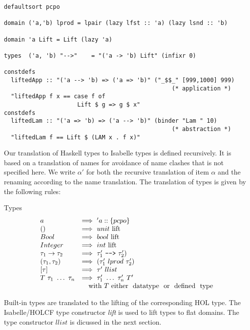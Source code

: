 \documentclass{llncs}
\begin{document}
\begin{verbatim} 
defaultsort pcpo

domain ('a,'b) lprod = lpair (lazy lfst :: 'a) (lazy lsnd :: 'b)

domain 'a Lift = Lift (lazy 'a)

types  ('a, 'b) "-->"    = "('a -> 'b) Lift" (infixr 0)

constdefs
  liftedApp :: "('a --> 'b) => ('a => 'b)" ("_$$_" [999,1000] 999)
                                                (* application *)
  "liftedApp f x == case f of
                     Lift $ g => g $ x"
constdefs
  liftedLam :: "('a => 'b) => ('a --> 'b)" (binder "Lam " 10)
                                                (* abstraction *)
  "liftedLam f == Lift $ (LAM x . f x)"
\end{verbatim}

Our translation of Haskell types to Isabelle types is defined
recursively.  It is based on a translation of names for avoidance of
name clashes that is not specified here. We write $\alpha'$ for both
the recursive translation of item $\alpha$ and the renaming according
to the name translation.  The translation of types is given by the
following rules:


\noindent Types
$$\begin{array}{ll}
  a & \Longrightarrow \ 'a::\{pcpo\} \\
  () & \Longrightarrow \ unit \ \mbox{lift} \\
  Bool & \Longrightarrow \ bool \ \mbox{lift} \\
  Integer & \Longrightarrow \ int \ \mbox{lift} \\
  \tau_{1} \to \tau_{2} & \Longrightarrow
  \ \tau'_{1} \ \verb@-->@ \ \tau'_{2})  \\
  (\tau_{1},\tau_{2}) & \Longrightarrow
  \ (\tau'_{1} ~lprod~ \tau'_{2}) \\
  {[\tau]} \ & \Longrightarrow \ \tau' \ llist \\
  T \ \tau_1 \ \ldots \ \tau_n & \Longrightarrow
  \ \tau'_1 \ \ldots \ \tau'_n \ T' \\
  & \quad \mbox{with} \ T \ \mbox{either \ datatype \ or \ defined \ type} \\
\end{array}$$

Built-in types are translated to the lifting of the corresponding HOL
type.  The Isabelle/HOLCF type constructor \emph{lift} is used to lift
types to flat domains. The type constructor $llist$ is dicussed in the
next section.
\end{document}
